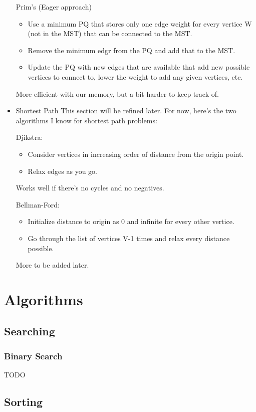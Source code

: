 \documentclass[11pt]{article}
\begin{document}
\begin{itemize}
Prim's (Eager approach)
\begin{itemize}
\item Use a minimum PQ that stores only one edge weight for every vertice W (not in the MST) that can be connected to the MST.
\item Remove the minimum edgr from the PQ and add that to the MST.
\item Update the PQ with new edges that are available that add new possible vertices to connect to, lower the weight to add any given vertices, etc.
\end{itemize}
More efficient with our memory, but a bit harder to keep track of.

\item Shortest Path
\label{sec:orgdef6bfc}
This section will be refined later. For now, here's the two algorithms I know for shortest path problems:

Djikstra:
\begin{itemize}
\item Consider vertices in increasing order of distance from the origin point.
\item Relax edges as you go.
\end{itemize}
Works well if there's no cycles and no negatives.

Bellman-Ford:
\begin{itemize}
\item Initialize distance to origin as 0 and infinite for every other vertice.
\item Go through the list of vertices V-1 times and relax every distance possible.
\end{itemize}

More to be added later.
\end{itemize}
\section*{Algorithms}
\label{sec:orgf5debf9}

\subsection*{Searching}
\label{sec:org98eab77}
\subsubsection*{Binary Search}
\label{sec:org9b5879a}
TODO
\subsection*{Sorting}
\label{sec:orgb3bdf9f}
\end{document}
